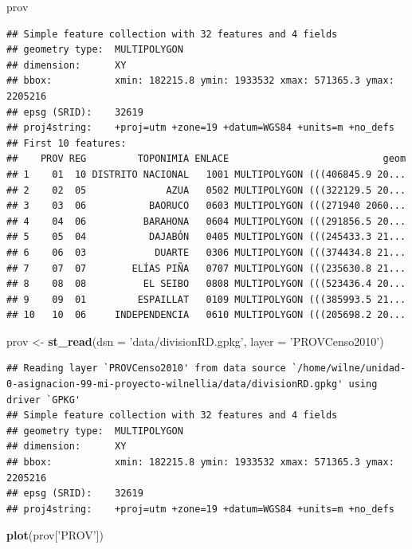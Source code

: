 \documentclass[11pt,]{article}
\newenvironment{Shaded}{\begin{snugshade}}{\end{snugshade}}
\newcommand{\KeywordTok}[1]{\textcolor[rgb]{0.13,0.29,0.53}{\textbf{#1}}}
\newcommand{\DataTypeTok}[1]{\textcolor[rgb]{0.13,0.29,0.53}{#1}}
\newcommand{\StringTok}[1]{\textcolor[rgb]{0.31,0.60,0.02}{#1}}
\newcommand{\NormalTok}[1]{#1}
\begin{document}
\begin{Shaded}
\begin{Highlighting}[]
\NormalTok{prov}
\end{Highlighting}
\end{Shaded}

\begin{verbatim}
## Simple feature collection with 32 features and 4 fields
## geometry type:  MULTIPOLYGON
## dimension:      XY
## bbox:           xmin: 182215.8 ymin: 1933532 xmax: 571365.3 ymax: 2205216
## epsg (SRID):    32619
## proj4string:    +proj=utm +zone=19 +datum=WGS84 +units=m +no_defs
## First 10 features:
##    PROV REG         TOPONIMIA ENLACE                           geom
## 1    01  10 DISTRITO NACIONAL   1001 MULTIPOLYGON (((406845.9 20...
## 2    02  05              AZUA   0502 MULTIPOLYGON (((322129.5 20...
## 3    03  06           BAORUCO   0603 MULTIPOLYGON (((271940 2060...
## 4    04  06          BARAHONA   0604 MULTIPOLYGON (((291856.5 20...
## 5    05  04           DAJABÓN   0405 MULTIPOLYGON (((245433.3 21...
## 6    06  03            DUARTE   0306 MULTIPOLYGON (((374434.8 21...
## 7    07  07        ELÍAS PIÑA   0707 MULTIPOLYGON (((235630.8 21...
## 8    08  08          EL SEIBO   0808 MULTIPOLYGON (((523436.4 20...
## 9    09  01         ESPAILLAT   0109 MULTIPOLYGON (((385993.5 21...
## 10   10  06     INDEPENDENCIA   0610 MULTIPOLYGON (((205698.2 20...
\end{verbatim}

\begin{Shaded}
\begin{Highlighting}[]
\NormalTok{prov <-}\StringTok{ }\KeywordTok{st_read}\NormalTok{(}\DataTypeTok{dsn =} \StringTok{'data/divisionRD.gpkg'}\NormalTok{, }\DataTypeTok{layer =} \StringTok{'PROVCenso2010'}\NormalTok{)}
\end{Highlighting}
\end{Shaded}

\begin{verbatim}
## Reading layer `PROVCenso2010' from data source `/home/wilne/unidad-0-asignacion-99-mi-proyecto-wilnellia/data/divisionRD.gpkg' using driver `GPKG'
## Simple feature collection with 32 features and 4 fields
## geometry type:  MULTIPOLYGON
## dimension:      XY
## bbox:           xmin: 182215.8 ymin: 1933532 xmax: 571365.3 ymax: 2205216
## epsg (SRID):    32619
## proj4string:    +proj=utm +zone=19 +datum=WGS84 +units=m +no_defs
\end{verbatim}

\begin{Shaded}
\begin{Highlighting}[]
\KeywordTok{plot}\NormalTok{(prov[}\StringTok{'PROV'}\NormalTok{])}
\end{Highlighting}
\end{Shaded}
\end{document}

